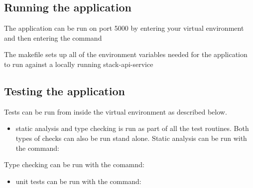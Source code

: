 \hypertarget{running-the-application}{%
\subsection{Running the application}\label{running-the-application}}

The application can be run on port 5000 by entering your virtual
environment and then entering the command

\begin{Shaded}
\begin{Highlighting}[]
\end{Highlighting}
\end{Shaded}

The makefile sets up all of the environment variables needed for the
application to run against a locally running stack-api-service

\hypertarget{testing-the-application}{%
\subsection{Testing the application}\label{testing-the-application}}

Tests can be run from inside the virtual environment as described below.

\begin{itemize}
\tightlist
\item
  static analysis and type checking is run as part of all the test
  routines. Both types of checks can also be run stand alone. Static
  analysis can be run with the command:
\end{itemize}

\begin{Shaded}
\begin{Highlighting}[]
\end{Highlighting}
\end{Shaded}

Type checking can be run with the comamnd:

\begin{Shaded}
\begin{Highlighting}[]
\end{Highlighting}
\end{Shaded}

\begin{itemize}
\tightlist
\item
  unit tests can be run with the command:
\end{itemize}

